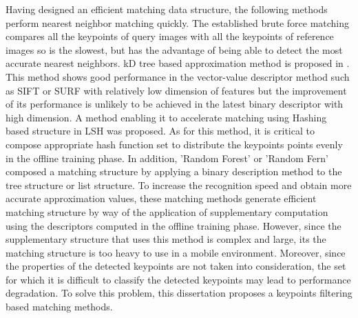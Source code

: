 Having designed an efficient matching data structure, the following methods perform nearest neighbor matching quickly. The established brute force matching compares all the keypoints of query images with all the keypoints of reference images so is the slowest, but has the advantage of being able to detect the most accurate nearest neighbors. kD tree based approximation method is proposed in \cite{beis_shape_1997}. This method shows good performance in the vector-value descriptor method such as SIFT or SURF with relatively low dimension of features but the improvement of its performance is unlikely to be achieved in the latest binary descriptor with high dimension. A method enabling it to accelerate matching using Hashing based structure in LSH\cite{gionis_similarity_1999} was proposed\cite{rublee_orb:_2011}. As for this method, it is critical to compose appropriate hash function set to distribute the keypoints points evenly in the offline training phase. In addition, 'Random Forest\cite{lepetit_keypoint_2006}' or 'Random Fern\cite{ozuysal_fast_2010}' composed a matching structure by applying a binary description method to the tree structure or list structure. To increase the recognition speed and obtain more accurate approximation values, these matching methods generate efficient matching structure by way of the application of supplementary computation using the descriptors computed in the offline training phase. However, since the supplementary structure that uses this method is complex and large, its the matching structure is too heavy to use in a mobile environment. Moreover, since the properties of the detected keypoints are not taken into consideration, the set for which it is difficult to classify the detected keypoints may lead to performance degradation. To solve this problem, this dissertation proposes a keypoints filtering based matching methods.  
